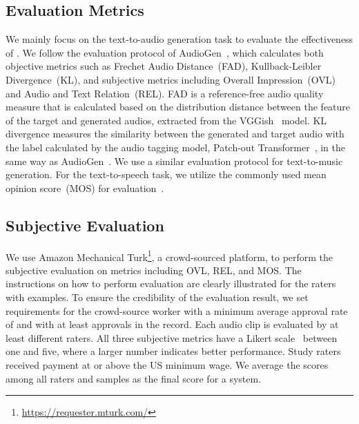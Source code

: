 \documentclass[lettersize,journal]{IEEEtran}
\begin{document}
\subsection{Evaluation Metrics} 
\noindent
We mainly focus on the text-to-audio generation task to evaluate the effectiveness of \vModelName. We follow the evaluation protocol of AudioGen~\cite{kreuk2022audiogen}, which calculates both objective metrics such as Frechet Audio Distance~(FAD), Kullback-Leibler Divergence~(KL), and subjective metrics including Overall Impression~(OVL) and Audio and Text Relation~(REL). FAD is a reference-free audio quality measure that is calculated based on the distribution distance between the feature of the target and generated audios, extracted from the VGGish~\cite{vggish_hershey2017cnn} model. KL divergence measures the similarity between the generated and target audio with the label calculated by the audio tagging model, Patch-out Transformer~\cite{koutini2021efficient}, in the same way as AudioGen~\cite{kreuk2022audiogen}. We use a similar evaluation protocol for text-to-music generation. For the text-to-speech task, we utilize the commonly used mean opinion score~(MOS) for evaluation~\cite{tan2023neural}. 


\subsection{Subjective Evaluation} 
\noindent
We use Amazon Mechanical Turk\footnote{\url{https://requester.mturk.com/}}, a crowd-sourced platform, to perform the subjective evaluation on metrics including OVL, REL, and MOS. The instructions on how to perform evaluation are clearly illustrated for the raters with examples. To ensure the credibility of the evaluation result, we set requirements for the crowd-source worker with a minimum average approval rate of  and with at least  approvals in the record. Each audio clip is evaluated by at least  different raters. All three subjective metrics have a Likert scale~\cite{likert1932technique} between one and five, where a larger number indicates better performance. Study raters received payment at or above the US minimum wage. We average the scores among all raters and samples as the final score for a system. 
\end{document}
